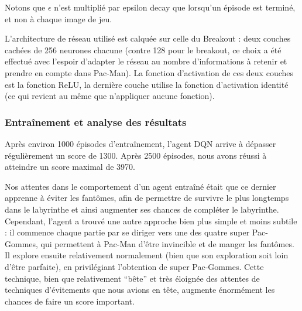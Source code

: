 Notons que $\epsilon$ n'est multiplié par epsilon decay que lorsqu'un épisode est terminé, et non à chaque image de jeu. 
\par
L'architecture de réseau utilisé est calquée sur celle du Breakout : deux couches cachées de 256 neurones chacune (contre 128 pour le breakout, ce choix a été effectué avec l'espoir d'adapter le réseau au nombre d'informations à retenir et prendre en compte dans Pac-Man). La fonction d'activation de ces deux couches est la fonction ReLU, la dernière couche utilise la fonction d'activation identité (ce qui revient au même que n'appliquer aucune fonction).


\subsubsection{Entraînement et analyse des résultats}
Après environ 1000 épisodes d'entraînement, l'agent DQN arrive à dépasser régulièrement un score de 1300. Après 2500 épisodes, nous avons réussi à atteindre un score maximal de 3970.
\par
Nos attentes dans le comportement d'un agent entraîné était que ce dernier apprenne à éviter les fantômes, afin de permettre de survivre le plus longtemps dans le labyrinthe et ainsi augmenter ses chances de compléter le labyrinthe. Cependant, l'agent a trouvé une autre approche bien plus simple et moins subtile : il commence chaque partie par se diriger vers une des quatre super Pac-Gommes, qui permettent à Pac-Man d'être invincible et de manger les fantômes. Il explore ensuite relativement normalement (bien que son exploration soit loin d'être parfaite), en privilégiant l'obtention de super Pac-Gommes. Cette technique, bien que relativement ``bête'' et très éloignée des attentes de techniques d'évitements que nous avions en tête, augmente énormément les chances de faire un score important.


